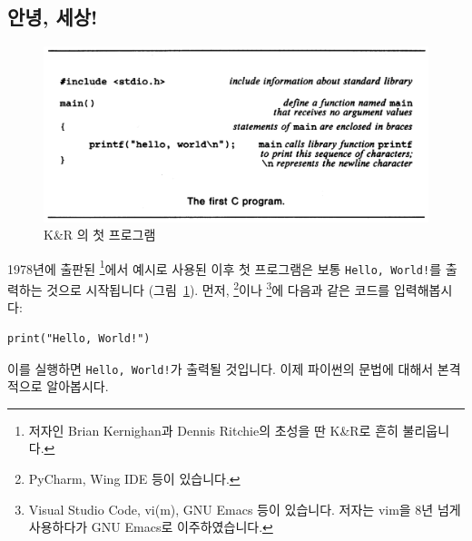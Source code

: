 \documentclass[../main.tex]{subfiles}
\begin{document}
\subsection{안녕, 세상!}

\begin{figure}[htpb]
  \centering
  \includegraphics[width=0.8\linewidth]{./figures/hello_world.png}
  \caption{K\&R 의 첫 프로그램}\label{fig:hello}
\end{figure}

1978년에 출판된 \footnote{저자인 Brian Kernighan과 Dennis Ritchie의 초성을 딴 K\&R로 흔히 불리웁니다.}에서 예시로 사용된 이후 첫 프로그램은 보통 \texttt{Hello, World!}를 출력하는 것으로 시작됩니다 (그림~\ref{fig:hello}).
먼저, \footnote{PyCharm, Wing IDE 등이 있습니다.}이나 \footnote{Visual Studio Code, vi(m), GNU Emacs 등이 있습니다. 저자는 vim을 8년 넘게 사용하다가 GNU Emacs로 이주하였습니다.}에 다음과 같은 코드를 입력해봅시다:
\begin{verbatim}
print("Hello, World!")
\end{verbatim}
이를 실행하면 \verb/Hello, World!/가 출력될 것입니다.
이제 파이썬의 문법에 대해서 본격적으로 알아봅시다.
\end{document}
